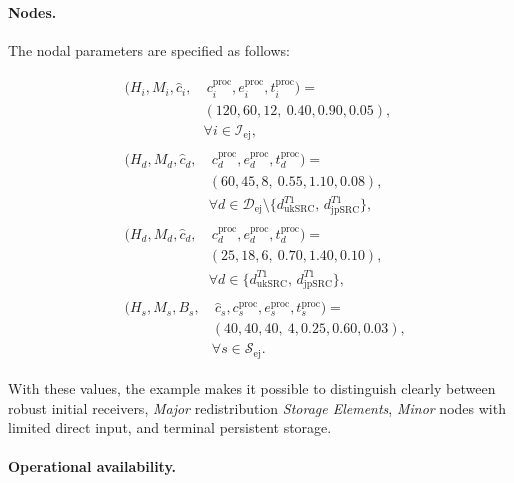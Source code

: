 \documentclass[a4paper,fleqn]{cas-dc}
\newcommand{\Iset}{\mathcal{I}}
\newcommand{\Dset}{\mathcal{D}}
\newcommand{\Sset}{\mathcal{S}}
\begin{document}
\paragraph{Nodes.} 

The nodal parameters are specified as follows:

\begin{align*}
&\begin{split}
  (H_i,M_i,\hat c_i, & \ c_i^{\mathrm{proc}},e_i^{\mathrm{proc}},t_i^{\mathrm{proc}}) = \\
  &(120,60,12, \ 0.40,0.90,0.05), \\
  &\forall i\in\Iset_{\mathrm{ej}},
\end{split} \\[2ex]
&\begin{split}
  (H_d,M_d,\hat c_d, & \ c_d^{\mathrm{proc}},e_d^{\mathrm{proc}},t_d^{\mathrm{proc}}) = \\
  &(60,45,8, \ 0.55,1.10,0.08), \\
  &\forall d\in\Dset_{\mathrm{ej}}\setminus\{d_{\mathrm{ukSRC}}^{T1},\, d_{\mathrm{jpSRC}}^{T1}\},
\end{split} \\[2ex]
&\begin{split}
  (H_d,M_d,\hat c_d, & \ c_d^{\mathrm{proc}},e_d^{\mathrm{proc}},t_d^{\mathrm{proc}}) = \\
  &(25,18,6, \ 0.70,1.40,0.10), \\
  &\forall d\in\{d_{\mathrm{ukSRC}}^{T1},\, d_{\mathrm{jpSRC}}^{T1}\},
\end{split} \\[2ex]
&\begin{split}
  (H_s,M_s,B_s, & \ \hat c_s,c_s^{\mathrm{proc}},e_s^{\mathrm{proc}},t_s^{\mathrm{proc}}) = \\
  &(40,40,40, \ 4,0.25,0.60,0.03), \\
  &\forall s\in\Sset_{\mathrm{ej}}.
\end{split}
\end{align*}


With these values, the example makes it possible to distinguish clearly between robust initial receivers, \emph{Major} redistribution \emph{Storage Elements}, \emph{Minor} nodes with limited direct input, and terminal persistent storage.


\paragraph{Operational availability.} 
\end{document}
